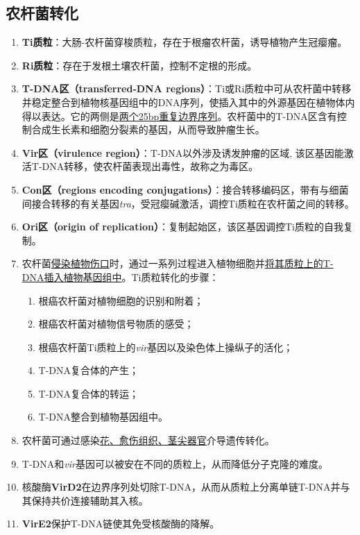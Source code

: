 \subsection{农杆菌转化}
\begin{enumerate}
    \item \textbf{Ti质粒}：大肠-农杆菌穿梭质粒，存在于根瘤农杆菌，诱导植物产生冠瘿瘤。
    \item \textbf{Ri质粒}：存在于发根土壤农杆菌，控制不定根的形成。
    \item \textbf{T-DNA区（transferred-DNA regions）}：Ti或Ri质粒中可从农杆菌中转移并稳定整合到植物核基因组中的DNA序列，使插入其中的外源基因在植物体内得以表达。它的两侧是\uline{两个25bp重复边界序列}。农杆菌中的T-DNA区含有控制合成生长素和细胞分裂素的基因，从而导致肿瘤生长。
    \item \textbf{Vir区（virulence region）}：T-DNA以外涉及诱发肿瘤的区域, 该区基因能激活T-DNA转移，使农杆菌表现出毒性，故称之为毒区。
    \item \textbf{Con区（regions encoding conjugations）}：接合转移编码区，带有与细菌间接合转移的有关基因\emph{tra}，受冠瘿碱激活，调控Ti质粒在农杆菌之间的转移。
    \item \textbf{Ori区（origin of replication）}：复制起始区，该区基因调控Ti质粒的自我复制。
    \item 农杆菌\uline{侵染植物伤口}时，通过一系列过程进入植物细胞并\uline{将其质粒上的T-DNA插入植物基因组中}。Ti质粒转化的步骤：
    \begin{enumerate}
        \item 根癌农杆菌对植物细胞的识别和附着；
        \item 根癌农杆菌对植物信号物质的感受；
        \item 根癌农杆菌Ti质粒上的\emph{vir}基因以及染色体上操纵子的活化；
        \item T-DNA复合体的产生；
        \item T-DNA复合体的转运；
        \item T-DNA整合到植物基因组中。
    \end{enumerate}
    \item 农杆菌可通过感染\uline{花、愈伤组织、茎尖器官}介导遗传转化。
    \item T-DNA和\emph{vir}基因可以被安在不同的质粒上，从而降低分子克隆的难度。
    \item 核酸酶\textbf{VirD2}在边界序列处切除T-DNA，从而从质粒上分离单链T-DNA并与其保持共价连接辅助其入核。
    \item \textbf{VirE2}保护T-DNA链使其免受核酸酶的降解。
\end{enumerate}


